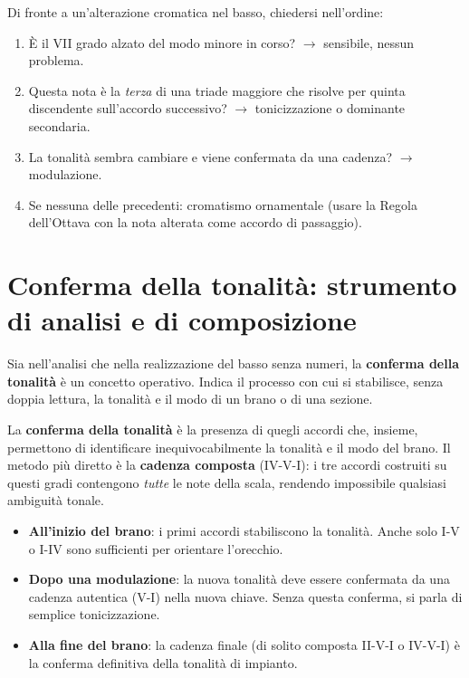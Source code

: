 \begin{regola}
	\label{reg:interpretazione_alterazione}
	Di fronte a un'alterazione cromatica nel basso, chiedersi nell'ordine:
	\begin{enumerate}
		\item È il VII grado alzato del modo minore in corso? $\rightarrow$ sensibile, nessun problema.
		\item Questa nota è la \textit{terza} di una triade maggiore che risolve per quinta discendente sull'accordo successivo? $\rightarrow$ tonicizzazione o dominante secondaria.
		\item La tonalità sembra cambiare e viene confermata da una cadenza? $\rightarrow$ modulazione.
		\item Se nessuna delle precedenti: cromatismo ornamentale (usare la Regola dell'Ottava con la nota alterata come accordo di passaggio).
	\end{enumerate}
\end{regola}

\section{Conferma della tonalità: strumento di analisi e di composizione}
\label{sec:conferma_tonalita}

Sia nell'analisi che nella realizzazione del basso senza numeri, la \textbf{conferma della tonalità} è un concetto operativo. Indica il processo con cui si stabilisce, senza doppia lettura, la tonalità e il modo di un brano o di una sezione.

\begin{definizione}
	\label{def:conferma_tonalita}
	La \textbf{conferma della tonalità} è la presenza di quegli accordi che, insieme, permettono di identificare inequivocabilmente la tonalità e il modo del brano. Il metodo più diretto è la \textbf{cadenza composta} (IV-V-I): i tre accordi costruiti su questi gradi contengono \textit{tutte} le note della scala, rendendo impossibile qualsiasi ambiguità tonale.
\end{definizione}

\begin{regola}
	\label{reg:quando_conferma_tonalita}
	\begin{itemize}
		\item \textbf{All'inizio del brano}: i primi accordi stabiliscono la tonalità. Anche solo I-V o I-IV sono sufficienti per orientare l'orecchio.
		\item \textbf{Dopo una modulazione}: la nuova tonalità deve essere confermata da una cadenza autentica (V-I) nella nuova chiave. Senza questa conferma, si parla di semplice tonicizzazione.
		\item \textbf{Alla fine del brano}: la cadenza finale (di solito composta II-V-I o IV-V-I) è la conferma definitiva della tonalità di impianto.
	\end{itemize}
\end{regola}

